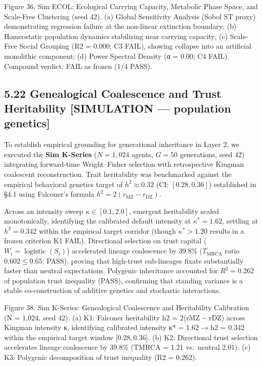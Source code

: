 \documentclass[
]{article}
\begin{document}
Figure 36. Sim ECOL: Ecological Carrying Capacity, Metabolic Phase
Space, and Scale-Free Clustering (seed 42). (a) Global Sensitivity
Analysis (Sobol {ST} proxy) demonstrating regression failure at the
non-linear extinction boundary; (b) Homeostatic population dynamics
stabilizing near carrying capacity; (c) Scale-Free Social Grouping
({R2 = 0.000}; C3 FAIL), showing collapse into an artificial monolithic
component; (d) Power Spectral Density ({α = 0.00}; C4 FAIL). Compound
verdict: FAIL as frozen (1/4 PASS).

\subsection{5.22 Genealogical Coalescence and Trust Heritability
{[}SIMULATION --- population
genetics{]}}\label{genealogical-coalescence-and-trust-heritability-simulation-population-genetics}

To establish empirical grounding for generational inheritance in Layer
2, we executed the \textbf{Sim K-Series} (\(N = 1,024\) agents,
\(G = 50\) generations, seed 42) integrating forward-time Wright--Fisher
selection with retrospective Kingman coalescent reconstruction. Trait
heritability was benchmarked against the empirical behavioral genetics
target of \(h^2 \approx 0.32\) (CI: \([0.28, 0.36]\)) established in
§4.1 using Falconer's formula
\(h^2 = 2(r_{\text{MZ}} - r_{\text{DZ}})\).

Across an intensity sweep \(\kappa \in [0.1, 2.0]\), emergent
heritability scaled monotonically, identifying the calibrated default
intensity at \(\kappa^* = 1.62\), settling at \(h^2 = 0.342\) within the
empirical target corridor (though \(\kappa^* > 1.20\) results in a
frozen criterion K1 FAIL). Directional selection on trust capital
(\(W_i = \operatorname{logistic}(S_i)\)) accelerated lineage coalescence
by \(39.8\%\) (\(T_{\text{MRCA}}\) ratio \(0.602 \le 0.65\); PASS),
proving that high-trust sub-lineages fixate substantially faster than
neutral expectations. Polygenic inheritance accounted for
\(R^2 = 0.262\) of population trust inequality (PASS), confirming that
standing variance is a stable co-construction of additive genetics and
stochastic interactions.

Figure 38. Sim K-Series: Genealogical Coalescence and Heritability
Calibration ({N = 1,024}, seed 42). (a) K1: Falconer heritability
{h2 = 2(rMZ − rDZ)} across Kingman intensity {κ}, identifying calibrated
intensity κ* = 1.62 → h2 = 0.342 within the empirical target window
{{[}0.28, 0.36{]}}. (b) K2: Directional trust selection accelerates
lineage coalescence by {39.8\%} ({TMRCA = 1.21} vs.~neutral {2.01}). (c)
K3: Polygenic decomposition of trust inequality ({R2 = 0.262}).
\end{document}
